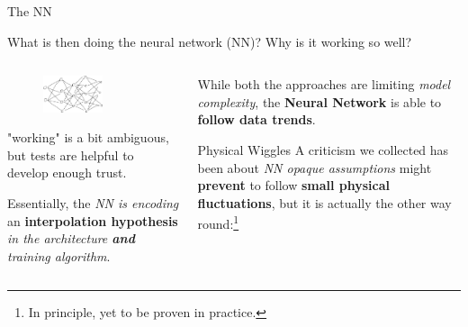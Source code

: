 \documentclass[9pt]{beamer}
\begin{document}
\begin{frame}{The NN}
    \begin{center}
        What is then doing the neural network (NN)? Why is it working so well?
    \end{center}
    \vspace*{10pt}

    \begin{columns}
        \begin{column}{0.5\textwidth}
            \begin{figure}
                \centering
                \includegraphics[width=0.6\textwidth]{nn}
            \end{figure}
            "working" is a bit ambiguous, but tests are helpful to develop
            enough trust.

            \vspace*{10pt}
                Essentially, the \textit{NN is encoding} an
                \alert{\textbf{interpolation hypothesis}} \textit{in the
                architecture \textbf{and} training algorithm}.
        \end{column}
        \begin{column}{0.5\textwidth}
            While both the approaches are limiting \textit{model complexity},
            the \textbf{Neural Network} is able to \textbf{follow data trends}.

            \vspace*{10pt}
            \begin{exampleblock}{Physical Wiggles}
                A criticism we collected has been about \textit{NN opaque
                assumptions} might \textbf{prevent} to follow \textbf{small
                physical fluctuations}, but it is actually the other way
                round:\footnote{In principle, yet to be proven in practice.}


\end{exampleblock}
\end{column}
\end{columns}
\end{frame}
\end{document}
